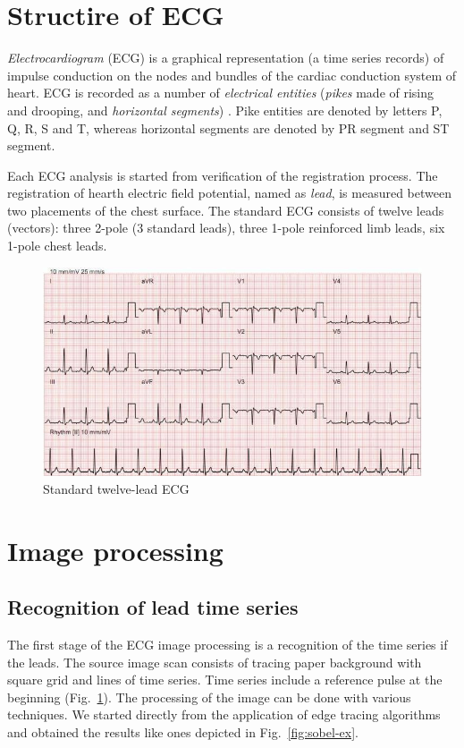 \documentclass[runningheads]{AIIT}
\begin{document}
\section{Structire of ECG}
\label{sec:structire-ecg}

\emph{Electrocardiogram} (ECG) is a graphical representation (a time series records) of impulse conduction on the nodes and bundles of the cardiac conduction system of heart.  ECG is recorded as a number of \emph{electrical entities} (\emph{pikes} made of rising and drooping, and \emph{horizontal segments}) \cite{wikipedia}.  Pike entities are denoted by letters P, Q, R, S and T, whereas horizontal segments are denoted by PR segment and ST segment.

Each ECG analysis is started from verification of the registration process.  The registration of hearth electric field potential, named as \emph{lead}, is measured between two placements of the chest surface.  The standard ECG consists of twelve leads (vectors): three 2-pole (3 standard leads), three 1-pole reinforced limb leads, six 1-pole chest leads.

\begin{figure}[htb]
  \centering
    \includegraphics[width=0.5\linewidth]{images/Stand_ECG.jpg}
  \caption{Standard twelve-lead ECG}
  \label{fig:leads-ex}
\end{figure}

\section{Image processing}
\label{sec:image-processing}

\subsection{Recognition of lead time series}
\label{sec:digit-recogn}

The first stage of the ECG image processing is a recognition of the time series if the leads.  The source image scan consists of tracing paper background with square grid and lines of time series.  Time series include a reference pulse at the beginning (Fig.~\ref{fig:leads-ex}).  The processing of the image can be done with various techniques.  We started directly from the application of edge tracing algorithms and obtained the results like ones depicted in Fig.~\ref{fig:sobel-ex}.
\end{document}
